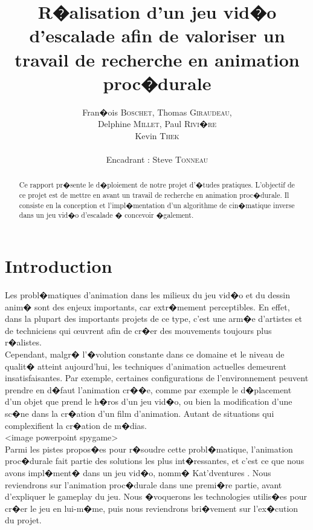 \documentclass[a4paper,11pt]{article}
\title{ \textbf{R�alisation d'un jeu vid�o d'escalade afin de valoriser un travail de recherche en 
animation proc�durale} }
\author{Fran�ois \textsc{Boschet}, Thomas \textsc{Giraudeau}, \\
        Delphine \textsc{Millet}, Paul \textsc{Rivi�re} \\
        Kevin \textsc{Thek} \\
        \\
        Encadrant : Steve \textsc{Tonneau}}
\date{}                    %
\begin{document}
          

\maketitle                 %
\thispagestyle{empty}      %



\begin{abstract}
Ce rapport pr�sente le d�ploiement de notre projet d'�tudes pratiques. L'objectif de ce projet est de mettre en avant un travail de recherche en animation proc�durale. Il consiste en la conception et l'impl�mentation d'un algorithme de cin�matique inverse dans un jeu vid�o d'escalade � concevoir �galement.

\end{abstract} 


\section{Introduction}  

Les probl�matiques d'animation dans les milieux du jeu vid�o et du dessin anim� sont des enjeux importants, car extr�mement perceptibles. En effet, dans la plupart des importants projets de ce type, c'est une arm�e d'artistes et de techniciens qui {\oe}uvrent afin de cr�er des mouvements toujours plus r�alistes. \\
Cependant, malgr� l'�volution constante dans ce domaine et le niveau de qualit� atteint aujourd'hui, les techniques d'animation actuelles demeurent insatisfaisantes. Par exemple, certaines configurations de l'environnement peuvent prendre en d�faut l'animation cr��e, comme par exemple le d�placement d'un objet que prend le h�ros d'un jeu vid�o, ou bien la modification d'une sc�ne dans la cr�ation d'un film d'animation. Autant de situations qui complexifient la cr�ation de m�dias.\\   
<image powerpoint spygame>\\
Parmi les pistes propos�es pour r�soudre cette probl�matique, l'animation proc�durale fait partie des solutions les plus int�ressantes, et c'est ce que nous avons impl�ment� dans un jeu vid�o, nomm� \og Kat'dventures \fg{}  . Nous reviendrons sur l'animation proc�durale dans une premi�re partie, avant d'expliquer le gameplay du jeu. Nous �voquerons les technologies utilis�es pour cr�er le jeu en lui-m�me, puis nous reviendrons bri�vement sur l'ex�cution du projet.
\end{document}
